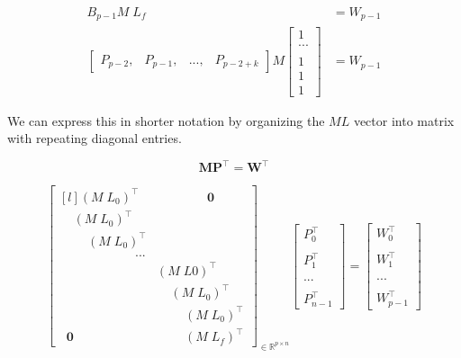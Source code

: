 \documentclass{article}
\begin{document}
\begin{equation}
\begin{aligned}
    B_{p-1} M \; L_f  & = W_{p-1} \\
    \begin{bmatrix} P_{p-2}, & P_{p-1}, & ..., & P_{p-2+k} \end{bmatrix} M \begin{bmatrix} 1 \\ ... \\\\ 1 \\ 1 \\ 1 \end{bmatrix} & = W_{p-1} 
\end{aligned}
\end{equation}

We can express this in shorter notation by organizing the \(M L\) vector into matrix with repeating diagonal entries.

\begin{equation}
     \textbf{M} \textbf{P}^{\intercal} = \textbf{W}^{\intercal}
\end{equation}

\begin{equation}
    \begin{bmatrix*}[l] (M \; L_0)^{\intercal} & \qquad \qquad \textbf{0} \\
    \;\; \;\; (M \; L_0)^{\intercal} & \\
    \;\; \;\; \;\; \;\; (M \; L_0)^{\intercal} & \\
    \qquad \qquad \qquad ... & \\
     & (M \; L0)^{\intercal} \;\; \;\; \;\; \;\; \\
     & \;\;\;\; (M \; L_0)^{\intercal} \;\; \;\; \\
     & \;\;\;\;\;\;\;\; (M \; L_0)^{\intercal} \\
    \;\; \textbf{0} & \;\;\;\;\;\;\;\; (M \; L_f)^{\intercal}
    \end{bmatrix*}_{\in \mathbb{R}^{p \times n}} 
    \begin{bmatrix}
        P_0^{\intercal} \\\\ P_1^\intercal \\\\ ... \\\\ P_{n-1}^\intercal
    \end{bmatrix} = 
    \begin{bmatrix} W_0^{\intercal} \\\\ W_1^{\intercal}  \\\\ ... \\\\ W_{p-1}^{\intercal} \end{bmatrix}
\end{equation}
    
\end{document}
